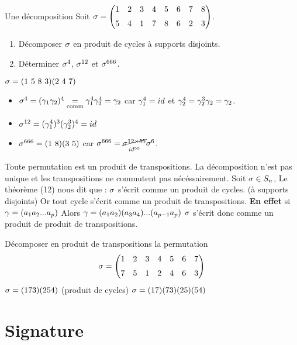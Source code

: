 \documentclass[11pt]{article}
\begin{document}
\begin{ex}{Une décomposition}{}
    Soit $\s=\begin{pmatrix}1&2&3&4&5&6&7&8\n5&4&1&7&8&6&2&3\end{pmatrix}$.
    \begin{enumerate}
        \item Décomposer $\sigma$ en produit de cycles à supports disjoints.
        \item Déterminer $\sigma^4$, $\sigma^{12}$ et $\sigma^{666}$.
    \end{enumerate}
    \tcblower
     $\sigma=(1~5~8~3)(2~4~7)$\n
     \begin{itemize}
        \item $\sigma^4=(\gamma_1\gamma_2)^4\underset{\text{comm}}{=}\gamma_1^4\gamma_2^4=\gamma_2$ car $\gamma_1^4=id$ et $\gamma_2^4=\gamma_2^3\gamma_2=\gamma_2$.
        \item $\sigma^{12}=(\gamma_1^{4})^3(\gamma_2^3)^4=id$
        \item $\sigma^{666}=(1~8)(3~5)$ car $\sigma^{666}=\underset{id^{55}}{\cancel{\sigma^{12\times55}}}\sigma^6$.
    \end{itemize}
\end{ex}

\begin{corr}{}{}
    Toute permutation est un produit de transpositions.\n
    La décomposition n'est pas unique et les transpositions ne commutent pas nécéssairement.
    \tcblower
    Soit $\sigma \in S_{n}$, \n 
    Le théorème (12) nous dit que : $\sigma$ s'écrit comme un produit de cycles. (à supports disjoints)\n
    Or tout cycle s'écrit comme un produit de transpositions.\n
    \textbf{En effet} si \n
    $\gamma = (a_{1} a_{2}  ...  a_{p})$\n
    Alors $\gamma = (a_{1} a_{2})(a_{3} a_{4}) ... (a_{p-1} a_{p})$\n
    $\sigma$ s'écrit donc comme un produit de produit de transpositions.
\end{corr}

\begin{ex}{}{}
    Décomposer en produit de transpositions la permutation \n
    \begin{equation*}
        \s = \begin{pmatrix}
            1 & 2 & 3 & 4 & 5 & 6 & 7 \n
            7 & 5 & 1 & 2 & 4 & 6 & 3
        \end{pmatrix}
    \end{equation*}
    \tcblower
    $\sigma = (1 7 3) (2 5 4)$ (produit de cycles)\n
    $\sigma = (1 7)(7 3)(2 5)(5 4)$
\end{ex}

\section{Signature}
\end{document}
